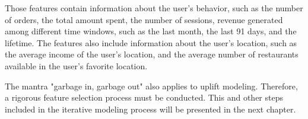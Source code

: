 Those features contain information about the user's behavior, such as the number of orders, the total amount spent, the number of sessions, revenue generated among different time windows, such
as the last month, the last 91 days, and the lifetime. The features also include information about the user's location, such as the average income of the user's location, and the average number of restaurants
available in the user's favorite location.

The mantra "garbage in, garbage out" also applies to uplift modeling. Therefore, a rigorous feature selection process must be conducted. This and other steps included in the iterative modeling process will be presented in the next chapter.